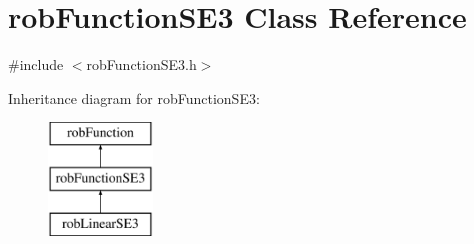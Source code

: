 \hypertarget{classrob_function_s_e3}{\section{rob\-Function\-S\-E3 Class Reference}
\label{classrob_function_s_e3}
}


{\ttfamily \#include $<$rob\-Function\-S\-E3.\-h$>$}

Inheritance diagram for rob\-Function\-S\-E3\-:\begin{figure}[H]
\begin{center}
\leavevmode
\includegraphics[height=3.000000cm]{d1/d3d/classrob_function_s_e3}
\end{center}
\end{figure}
